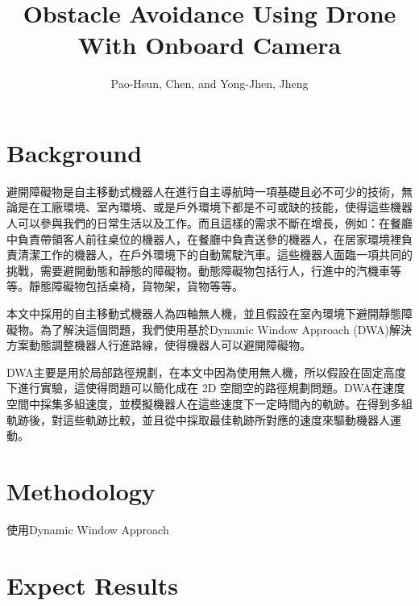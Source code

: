 \documentclass[]{article}
\title{Obstacle Avoidance Using Drone With Onboard Camera}
\author{Pao-Hsun, Chen, and Yong-Jhen, Jheng}
\begin{document}
	
	\maketitle
	
	\section{Background}
     避開障礙物是自主移動式機器人在進行自主導航時一項基礎且必不可少的技術，無論是在工廠環境、室內環境、或是戶外環境下都是不可或缺的技能，使得這些機器人可以參與我們的日常生活以及工作。而且這樣的需求不斷在增長，例如：在餐廳中負責帶領客人前往桌位的機器人，在餐廳中負責送參的機器人，在居家環境裡負責清潔工作的機器人，在戶外環境下的自動駕駛汽車。這些機器人面臨一項共同的挑戰，需要避開動態和靜態的障礙物。動態障礙物包括行人，行進中的汽機車等等。靜態障礙物包括桌椅，貨物架，貨物等等。
     
     本文中採用的自主移動式機器人為四軸無人機，並且假設在室內環境下避開靜態障礙物。為了解決這個問題，我們使用基於Dynamic Window Approach (DWA)解決方案動態調整機器人行進路線，使得機器人可以避開障礙物。
     
     DWA主要是用於局部路徑規劃，在本文中因為使用無人機，所以假設在固定高度下進行實驗，這使得問題可以簡化成在 2D 空間空的路徑規劃問題。DWA在速度空間中採集多組速度，並模擬機器人在這些速度下一定時間內的軌跡。在得到多組軌跡後，對這些軌跡比較，並且從中採取最佳軌跡所對應的速度來驅動機器人運動。
	\section{Methodology}
	使用Dynamic Window Approach
	\section{Expect Results}
	
\end{document}
